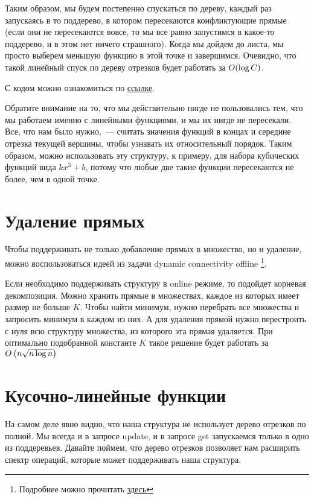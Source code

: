Таким образом, мы будем постепенно спускаться по дереву, каждый раз запускаясь в то поддерево, в котором пересекаются конфликтующие прямые (если они не пересекаются вовсе, то мы все равно запустимся в какое-то поддерево, и в этом нет ничего страшного). Когда мы дойдем до листа, мы просто выберем меньшую функцию в этой точке и завершимся. Очевидно, что такой линейный спуск по дереву отрезков будет работать за $O(\log C)$.

С кодом можно ознакомиться по \href{https://pastebin.com/eKpCKJQh}{ссылке}.

\begin{observation}
    Обратите внимание на то, что мы действительно нигде не пользовались тем, что мы работаем именно с линейными функциями, и мы их нигде не пересекали. Все, что нам было нужно,~--- считать значения функций в концах и середине отрезка текущей вершины, чтобы узнавать их относительный порядок. Таким образом, можно использовать эту структуру, к примеру, для набора кубических функций вида $k x^3 + b$, потому что любые две такие функции пересекаются не более, чем в одной точке.
\end{observation}

\section{Удаление прямых}

Чтобы поддерживать не только добавление прямых в множество, но и удаление, можно воспользоваться идеей из задачи dynamic connectivity offline \footnote{Подробнее можно прочитать \href{https://cp-algorithms.com/data_structures/deleting_in_log_n.html}{здесь}}.

Если необходимо поддерживать структуру в online режиме, то подойдет корневая декомпозиция. Можно хранить прямые в множествах, каждое из которых имеет размер не больше $K$. Чтобы найти минимум, нужно перебрать все множества и запросить минимум в каждом из них. А для удаления прямой нужно перестроить с нуля всю структуру множества, из которого эта прямая удаляется. При оптимально подобранной константе $K$ такое решение будет работать за $O \left(n \sqrt{n \log n}\right)$


\section{Кусочно-линейные функции}

На самом деле явно видно, что наша структура не использует дерево отрезков по полной. Мы всегда и в запросе update, и в запросе get запускаемся только в одно из поддеревьев. Давайте поймем, что дерево отрезков позволяет нам расширить спектр операций, которые может поддерживать наша структура.

